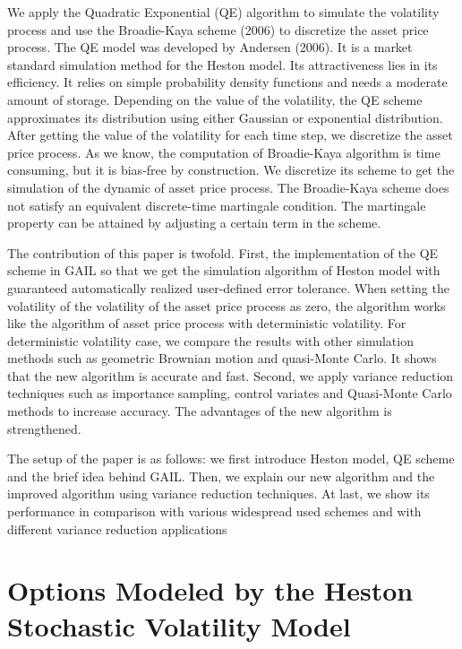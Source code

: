 \documentclass{ws-ijfe}
\begin{document}
We apply the Quadratic Exponential (QE) algorithm to simulate the volatility process and use the Broadie-Kaya scheme (2006) to discretize the asset price process. The QE model was developed by Andersen (2006). It is a market standard simulation method for the Heston model. Its attractiveness lies in its efficiency. It relies on simple probability density functions and needs a moderate amount of storage. Depending on the value of the volatility, the QE scheme approximates its distribution using either Gaussian or exponential distribution. After getting the value of the volatility for each time step, we discretize the asset price process. As we know, the computation of Broadie-Kaya algorithm is time consuming, but it is bias-free by construction. We discretize its scheme to get the simulation of the dynamic of asset price process. The Broadie-Kaya scheme does not satisfy an equivalent discrete-time martingale condition. The martingale property can be attained by adjusting a certain term in the scheme.


The contribution of this paper is twofold. First, the implementation of the QE scheme in GAIL so that we get the simulation algorithm of Heston model with guaranteed automatically realized user-defined error tolerance. When setting the volatility of the volatility of the asset price process as zero, the algorithm works like the algorithm of asset price process with deterministic volatility. For deterministic volatility case, we compare the results with other simulation methods such as geometric Brownian motion and quasi-Monte Carlo. It shows that the new algorithm is accurate and fast. Second, we apply variance reduction techniques such as importance sampling, control variates and Quasi-Monte Carlo methods to increase accuracy. The advantages of the new algorithm is strengthened.


The setup of the paper is as follows: we first introduce Heston model, QE scheme and the brief idea behind GAIL. Then, we explain our new algorithm and the improved algorithm using variance reduction techniques. At last, we show its performance in comparison with various widespread used schemes and with different variance reduction applications

\section{Options Modeled by the Heston Stochastic Volatility Model}
\end{document}
